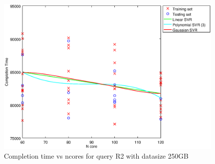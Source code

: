
\begin {figure}[hbtp]
\centering
\includegraphics[width=\textwidth]{output/R2_250_ONLY_1_LINEAR_NCORE/plot_R2_250_bestmodels.eps}
\caption{Completion time vs ncores for query R2 with datasize 250GB}
\label{fig:only_1_linear_R2_250}
\end {figure}
